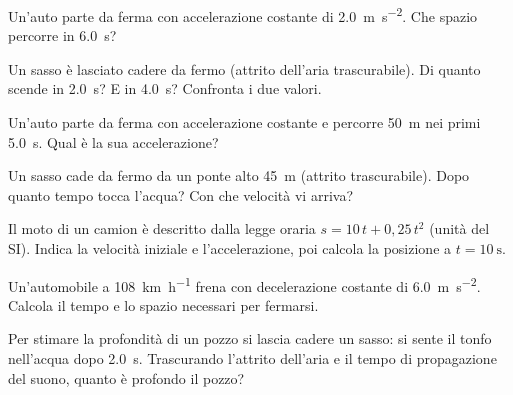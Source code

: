 \begin{esercizio}
Un'auto parte da ferma con accelerazione costante di \SI{2,0}{\metre\per\second\squared}. Che spazio percorre in \SI{6,0}{\second}?\\
\end{esercizio}

\begin{esercizio}
Un sasso è lasciato cadere da fermo (attrito dell'aria trascurabile). Di quanto scende in \SI{2,0}{\second}? E in \SI{4,0}{\second}? Confronta i due valori.\\
\end{esercizio}

\begin{esercizio}
Un'auto parte da ferma con accelerazione costante e percorre \SI{50}{\metre} nei primi \SI{5,0}{\second}. Qual è la sua accelerazione?\\
\end{esercizio}

\begin{esercizio}
Un sasso cade da fermo da un ponte alto \SI{45}{\metre} (attrito trascurabile). Dopo quanto tempo tocca l'acqua? Con che velocità vi arriva?\\
\end{esercizio}

\begin{esercizio}
Il moto di un camion è descritto dalla legge oraria $s = 10\,t + 0{,}25\,t^2$ (unità del SI). Indica la velocità iniziale e l'accelerazione, poi calcola la posizione a $t = \SI{10}{\second}$.\\
\end{esercizio}

\begin{esercizio}
Un'automobile a \SI{108}{\kilo\metre\per\hour} frena con decelerazione costante di \SI{6,0}{\metre\per\second\squared}. Calcola il tempo e lo spazio necessari per fermarsi.\\
\end{esercizio}

\begin{esercizio}
Per stimare la profondità di un pozzo si lascia cadere un sasso: si sente il tonfo nell'acqua dopo \SI{2,0}{\second}. Trascurando l'attrito dell'aria e il tempo di propagazione del suono, quanto è profondo il pozzo?\\
\end{esercizio}


